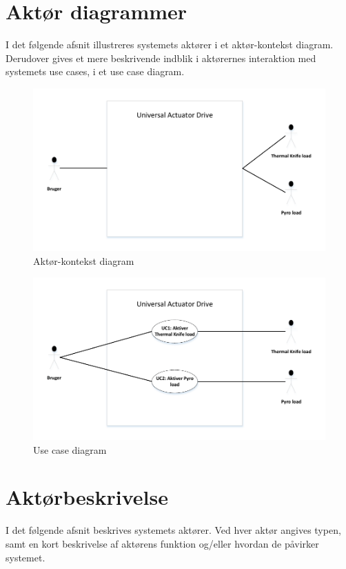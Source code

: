 \clearpage



\section{Aktør diagrammer}
I det følgende afsnit illustreres systemets aktører i et aktør-kontekst diagram. Derudover gives et mere beskrivende indblik i aktørernes interaktion med systemets use cases, i et use case diagram.
\begin{figure}[H]
	\centering
	\includegraphics{tex/Kravspecifikation/billeder/AktorkontekstdiagramV1.pdf}
	\caption{Aktør-kontekst diagram}
\end{figure}

\begin{figure}[H]
	\centering
	\includegraphics{tex/Kravspecifikation/billeder/UseCasediagramV1.pdf}
	\caption{Use case diagram}
\end{figure}




\section{Aktørbeskrivelse}
I det følgende afsnit beskrives systemets aktører. Ved hver aktør angives typen, samt en kort beskrivelse af aktørens funktion og/eller hvordan de påvirker systemet.

